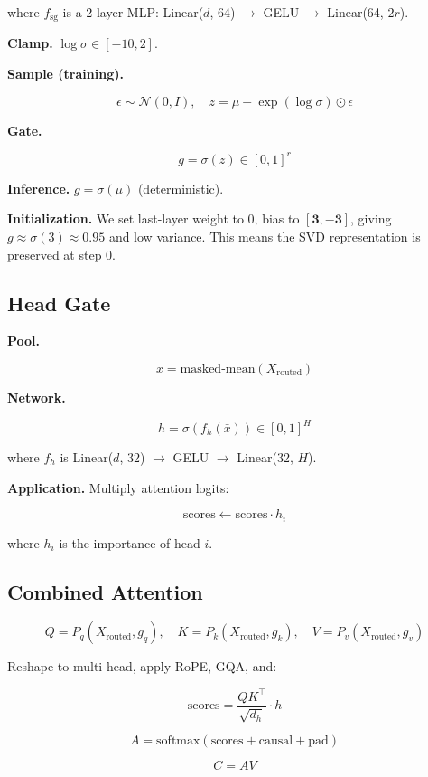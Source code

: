 where $f_\text{sg}$ is a 2-layer MLP: Linear($d$, 64) $\to$ GELU $\to$ Linear(64, $2r$).

\textbf{Clamp.} $\log \sigma \in [-10, 2]$.

\textbf{Sample (training).}

\[
\epsilon \sim \mathcal{N}(0, I), \quad z = \mu + \exp(\log \sigma) \odot \epsilon
\tag{4.9}
\]

\textbf{Gate.}

\[
g = \sigma(z) \in [0, 1]^r
\tag{4.10}
\]

\textbf{Inference.} $g = \sigma(\mu)$ (deterministic).

\textbf{Initialization.} We set last-layer weight to 0, bias to $[\mathbf{3}, \mathbf{-3}]$, 
giving $g \approx \sigma(3) \approx 0.95$ and low variance. This means the 
SVD representation is preserved at step 0.

\subsection{Head Gate}

\textbf{Pool.}

\[
\bar{x} = \text{masked-mean}(X_\text{routed})
\tag{4.11}
\]

\textbf{Network.}

\[
h = \sigma(f_h(\bar{x})) \in [0, 1]^H
\tag{4.12}
\]

where $f_h$ is Linear($d$, 32) $\to$ GELU $\to$ Linear(32, $H$).

\textbf{Application.} Multiply attention logits:

\[
\text{scores} \leftarrow \text{scores} \cdot h_i
\tag{4.13}
\]

where $h_i$ is the importance of head $i$.

\subsection{Combined Attention}

\[
Q = P_q(X_\text{routed}, g_q), \quad K = P_k(X_\text{routed}, g_k), \quad V = P_v(X_\text{routed}, g_v)
\tag{4.14}
\]

Reshape to multi-head, apply RoPE, GQA, and:

\[
\text{scores} = \frac{Q K^\top}{\sqrt{d_h}} \cdot h
\tag{4.15}
\]

\[
A = \text{softmax}(\text{scores} + \text{causal} + \text{pad})
\tag{4.16}
\]

\[
C = A V
\tag{4.17}
\]

